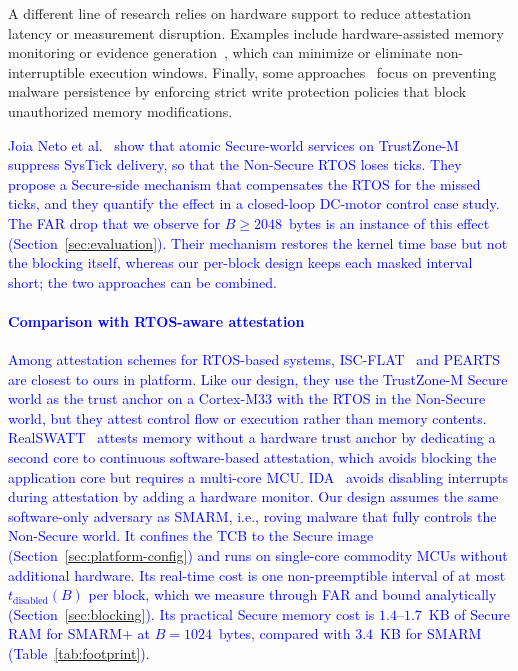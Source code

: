 \documentclass[journal]{IEEEtran}
\newcommand\ben[1]{\textcolor{blue}{#1}}
\newcommand{\rtsmarm}{SMARM+\xspace}
\begin{document}
A different line of research relies on hardware support to reduce attestation latency or measurement disruption.
Examples include hardware-assisted memory monitoring or evidence generation~\cite{li2023interruptible,lofat,litehax,atrium}, which can minimize or eliminate non-interruptible execution windows.
Finally, some approaches~\cite{casu,rata} focus on preventing malware persistence by enforcing strict write protection policies that block unauthorized memory modifications.

\ben{Joia Neto et al.~\cite{joianeto2026timekeeping} show that atomic Secure-world services on TrustZone-M suppress SysTick delivery, so that the Non-Secure RTOS loses ticks.
They propose a Secure-side mechanism that compensates the RTOS for the missed ticks, and they quantify the effect in a closed-loop DC-motor control case study.
The FAR drop that we observe for $B \ge 2048$~bytes is an instance of this effect (Section~\ref{sec:evaluation}).
Their mechanism restores the kernel time base but not the blocking itself, whereas our per-block design keeps each masked interval short; the two approaches can be combined.}

\paragraph{\ben{Comparison with RTOS-aware attestation}}
\ben{Among attestation schemes for RTOS-based systems, ISC-FLAT~\cite{iscflat} and PEARTS~\cite{pearts} are closest to ours in platform.
Like our design, they use the TrustZone-M Secure world as the trust anchor on a Cortex-M33 with the RTOS in the Non-Secure world, but they attest control flow or execution rather than memory contents.
RealSWATT~\cite{realswatt} attests memory without a hardware trust anchor by dedicating a second core to continuous software-based attestation, which avoids blocking the application core but requires a multi-core MCU.
IDA~\cite{ida2024} avoids disabling interrupts during attestation by adding a hardware monitor.
Our design assumes the same software-only adversary as SMARM, i.e., roving malware that fully controls the Non-Secure world.
It confines the TCB to the Secure image (Section~\ref{sec:platform-config}) and runs on single-core commodity MCUs without additional hardware.
Its real-time cost is one non-preemptible interval of at most $t_{\text{disabled}}(B)$ per block, which we measure through FAR and bound analytically (Section~\ref{sec:blocking}).
Its practical Secure memory cost is $1.4$--$1.7$~KB of Secure RAM for \rtsmarm at $B = 1024$~bytes, compared with $3.4$~KB for SMARM (Table~\ref{tab:footprint}).}
\end{document}
